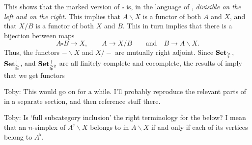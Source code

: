 \documentclass[main.tex]{subfiles}
\begin{document}
This shows that the marked version of $\square$ is, in the language of \cite{qcats_vs_segal_spaces}, \emph{divisible on the left and on the right.} This implies that $A \backslash X$ is a functor of both $A$ and $X$, and that $X / B$ is a functor of both $X$ and $B$. This in turn implies that there is a bijection between maps
\begin{equation*}
  A \square B \to X,\qquad A \to X / B \qquad \text{and}\quad B \to A \backslash X.
\end{equation*}
Thus, the functors $- \backslash X$ and $X / -$ are mutually right adjoint. Since $\mathbf{Set}_{\mathbb{\Delta}}$, $\mathbf{Set}_{\mathbb{\Delta}}^{+}$, and $\mathbf{Set}_{\mathbb{\Delta}^{2}}^{+}$ are all finitely complete and cocomplete, the results of \cite[Sec.\ 7]{qcats_vs_segal_spaces} imply that we get functors

\begin{note}
  Toby: This would go on for a while. I'll probably reproduce the relevant parts of \cite{qcats_vs_segal_spaces} in a separate section, and then reference stuff there.
\end{note}

%

\begin{note}
  Toby: Is `full subcategory inclusion' the right terminology for the below? I mean that an $n$-simplex of $A^{\flat} \backslash X$ belongs to in $A \backslash X$ if and only if each of its vertices belong to $A^{\flat}$.
\end{note}
\end{document}
